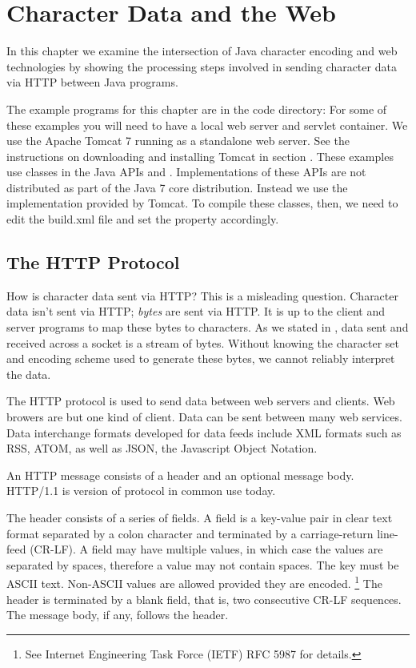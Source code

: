 \chapter{Character Data and the Web}\label{chapter:web}

In this chapter we examine the intersection of Java character encoding 
and web technologies by showing the processing steps involved 
in sending character data via HTTP between Java programs.

The example programs for this chapter are in the code directory:
%
%
For some of these examples you will need to have a local web server and servlet container.
We use the Apache Tomcat 7 running as a standalone web server.
See the instructions on downloading and installing Tomcat in section .
These examples use classes in the Java APIs  and .
Implementations of these APIs are not distributed as part of the Java 7 core distribution.
Instead we use the implementation provided by Tomcat.
To compile these classes, then, we need to edit the build.xml file and set the
property  accordingly.


\section{The HTTP Protocol}

How is character data sent via HTTP?
This is a misleading question.
Character data isn't sent via HTTP; \emph{bytes} are sent via HTTP.
It is up to the client and server programs to map these bytes to characters.
As we stated in ,
data sent and received across a socket is a stream of bytes.
Without knowing the character set and encoding scheme used to generate
these bytes, we cannot reliably interpret the data.

The HTTP protocol is used to send data between web servers and clients.
Web browers are but one kind of client.
Data can be sent between many web services.
Data interchange formats developed for data feeds include XML formats such as
RSS, ATOM, as well as JSON, the Javascript Object Notation.

An HTTP message consists of a header and an optional message body.
HTTP/1.1 is version of protocol in common use today.

The header consists of a series of fields.
A field is a key-value pair in clear text format separated by a colon character
and terminated by a carriage-return line-feed (CR-LF).
A field may have multiple values, in which case the values are separated by spaces,
therefore a value may not contain spaces.
The key must be ASCII text.
Non-ASCII values are allowed provided they are encoded.%
%
\footnote{See Internet Engineering Task Force (IETF) RFC 5987 for details.}
%
The header is terminated by a blank field, that is, two consecutive CR-LF sequences.
The message body, if any, follows the header.

